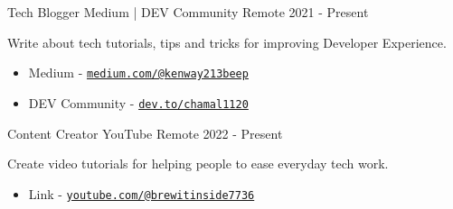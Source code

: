 

\begin{cventries}

  \cventry
    {Tech Blogger} %
    {Medium | DEV Community} %
    {Remote} %
    {2021 - Present} %
    {
      \begin{cvitems} %
        \item {Write about tech tutorials, tips and tricks for improving Developer Experience.}
        \begin{itemize}
            \item Medium - \href{https://medium.com/@kenway213beep}{\nolinkurl{medium.com/@kenway213beep}}
            \item DEV Community - \href{https://dev.to/chamal1120}{\nolinkurl{dev.to/chamal1120}}
        \end{itemize}
      \end{cvitems}
    }
    
  \cventry
    {Content Creator} %
    {YouTube} %
    {Remote} %
    {2022 - Present} %
    {
      \begin{cvitems} %
        \item {Create video tutorials for helping people to ease everyday tech work.}
        \begin{itemize}
            \item Link - \href{https://www.youtube.com/@brewitinside7736}{\nolinkurl{youtube.com/@brewitinside7736}}
        \end{itemize}
      \end{cvitems}
    }

\end{cventries}
